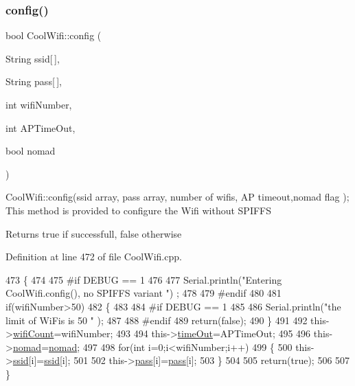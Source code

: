 \subsubsection{\texorpdfstring{config()}{config()}\hspace{0.1cm}{\footnotesize\ttfamily [2/2]}}
{\footnotesize\ttfamily bool Cool\+Wifi\+::config (\begin{DoxyParamCaption}\item[{String}]{ssid\mbox{[}$\,$\mbox{]},  }\item[{String}]{pass\mbox{[}$\,$\mbox{]},  }\item[{int}]{wifi\+Number,  }\item[{int}]{A\+P\+Time\+Out,  }\item[{bool}]{nomad }\end{DoxyParamCaption})}

Cool\+Wifi\+::config(ssid array, pass array, number of wifis, A\+P timeout,nomad flag ); This method is provided to configure the Wifi without S\+P\+I\+F\+FS

\begin{DoxyReturn}{Returns}
true if successfull, false otherwise 
\end{DoxyReturn}


Definition at line 472 of file Cool\+Wifi.\+cpp.


\begin{DoxyCode}
473 \{
474 
475 \textcolor{preprocessor}{#if DEBUG == 1 }
476     
477     Serial.println(\textcolor{stringliteral}{"Entering CoolWifi.config(), no SPIFFS variant "}) ;
478     
479 \textcolor{preprocessor}{#endif}
480     
481     \textcolor{keywordflow}{if}(wifiNumber>50)
482     \{
483     
484 \textcolor{preprocessor}{    #if DEBUG == 1 }
485         
486         Serial.println(\textcolor{stringliteral}{"the limit of WiFis is 50 "} );
487         
488 \textcolor{preprocessor}{    #endif}
489         \textcolor{keywordflow}{return}(\textcolor{keyword}{false});  
490     \}
491 
492     this->\hyperlink{class_cool_wifi_ab133bd92fcb895b884deecd6678592e4}{wifiCount}=wifiNumber;
493 
494     this->\hyperlink{class_cool_wifi_a952111605f25156588b5632caaba1c6f}{timeOut}=APTimeOut;
495 
496     this->\hyperlink{class_cool_wifi_ab7d9643c4af7bac3be331ef008b2ea27}{nomad}=\hyperlink{class_cool_wifi_ab7d9643c4af7bac3be331ef008b2ea27}{nomad};
497     
498     \textcolor{keywordflow}{for}(\textcolor{keywordtype}{int} i=0;i<wifiNumber;i++)
499     \{
500         this->\hyperlink{class_cool_wifi_a893b21d0fed821438733bba2e73fb4c2}{ssid}[i]=\hyperlink{class_cool_wifi_a893b21d0fed821438733bba2e73fb4c2}{ssid}[i];
501         
502         this->\hyperlink{class_cool_wifi_a0c3332a149245aaad060b32593a54c9b}{pass}[i]=\hyperlink{class_cool_wifi_a0c3332a149245aaad060b32593a54c9b}{pass}[i];
503     \}
504         
505     \textcolor{keywordflow}{return}(\textcolor{keyword}{true});
506 
507 \}
\end{DoxyCode}
\mbox{\label{class_cool_wifi_ad060353050f40d032a2dbf9e54a768bf}} 
